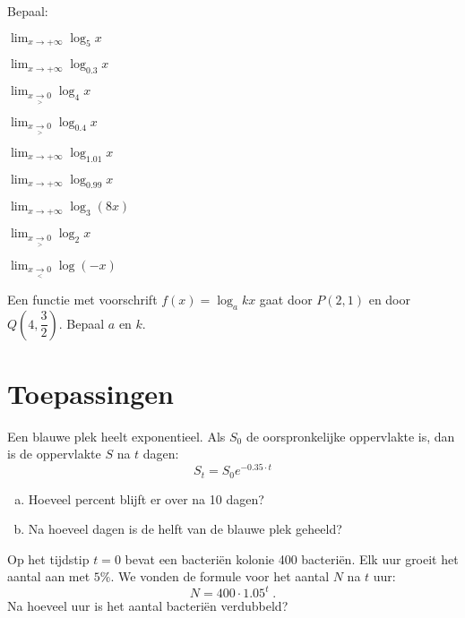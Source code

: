 \documentclass[12pt,twoside]{article}
\begin{document}
\begin{oefening} %
Bepaal:
\begin{exlist}{3}
  \item $\displaystyle\lim_{x\to +\infty}\log_5 x$
  \item $\displaystyle\lim_{x\to +\infty}\log_{0.3} x$
  \item $\displaystyle\lim_{x\underset{>}{\to} 0}\log_4 x$
  \item $\displaystyle\lim_{x\underset{>}{\to} 0}\log_{0.4} x$
  \item $\displaystyle\lim_{x\to +\infty}\log_{1.01} x$
  \item $\displaystyle\lim_{x\to +\infty}\log_{0.99} x$
  \item $\displaystyle\lim_{x\to +\infty}\log_{3} (8x)$
  \item $\displaystyle\lim_{x\underset{>}{\to} 0}\log_{2} x$
  \item $\displaystyle\lim_{x\underset{<}{\to} 0}\log (-x)$
\end{exlist}
\end{oefening}

\begin{oefening} %
Een functie met voorschrift $f(x)=\log_a kx$ gaat door $P(2,1)$ en door $Q(4,\dfrac{3}{2})$. Bepaal $a$ en $k$.
\end{oefening}

\section{Toepassingen}

\begin{oefening} %
Een blauwe plek heelt exponentieel. Als $S_0$ de oorspronkelijke oppervlakte is, dan is de oppervlakte $S$ na $t$ dagen:
$$S_t=S_0e^{-0.35\cdot t}$$
\begin{enumerate}[(a)]
  \item Hoeveel percent blijft er over na 10 dagen?
  \item Na hoeveel dagen is de helft van de blauwe plek geheeld?
\end{enumerate}
\end{oefening}

\vspace*{-0.5cm}

\begin{oefening}
Op het tijdstip $t=0$ bevat een bacteriën kolonie 400 bacteriën. Elk uur groeit het aantal aan met $5 \%$. We vonden de formule voor het aantal $N$ na $t$ uur:
$$N=400\cdot 1.05^t\;.$$
Na hoeveel uur is het aantal bacteriën verdubbeld?
\end{oefening}
\end{document}
